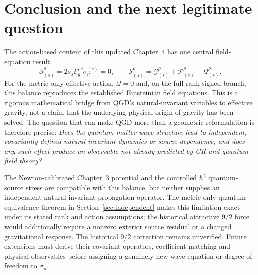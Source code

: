 \documentclass[11pt,a4paper]{article}
\newcommand{\cE}{\mathcal E}
\newcommand{\cG}{\mathscr G}
\newcommand{\cT}{\mathscr T}
\newcommand{\cQ}{\mathscr Q}
\newcommand{\cS}{\mathscr S}
\begin{document}
\section{Conclusion and the next legitimate question}
The action-based content of this updated Chapter~4 has one central field-equation result:
\begin{equation}\label{eq:conclusion}
\boxed{\cS_{(s)}^\rho
=2s_s\cE_g^{\rho\nu}\sigma_\nu^{(s)}=0,\qquad
\cS_{(s)}^\rho=\cG_{(s)}^\rho+\cT_{(s)}^\rho+\cQ_{(s)}^\rho.}
\end{equation}
For the metric-only effective action, $\cQ=0$ and, on the
full-rank signed branch, this balance reproduces the established
Einsteinian field equations. This is a rigorous mathematical bridge
from QGD's natural-invariant variables to effective gravity, not a
claim that the underlying physical origin of gravity has been solved.
The question that can make QGD more than a geometric reformulation
is therefore precise: \emph{Does the quantum matter-wave structure
lead to independent, covariantly defined natural-invariant dynamics
or source dependence, and does any such effect produce an observable
not already predicted by GR and quantum field theory?}
\par\medskip
The Newton-calibrated Chapter~3 potential and the controlled $\hbar^2$
quantum-source stress are compatible with this balance, but neither
supplies an independent natural-invariant propagation operator.
The metric-only quantum-equivalence theorem in
Section~\ref{sec:independent} makes this limitation exact under
its stated rank and action assumptions; the historical attractive
$9/2$ force would additionally require a nonzero exterior source
residual or a changed gravitational response. The
historical $9/2$ correction remains unverified. Future extensions must
derive their covariant operators, coefficient matching and physical
observables before assigning a genuinely new wave equation or degree
of freedom to $\sigma_\mu$.


\end{document}
